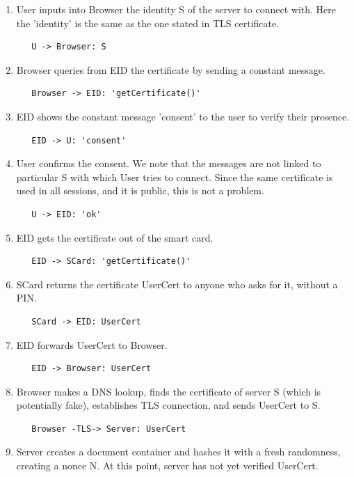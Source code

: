 \begin{enumerate}
\item User inputs into Browser the identity S of the server to connect with. Here the 'identity' is the same as the one stated in TLS certificate. 
\begin{verbatim}
   U -> Browser: S
\end{verbatim}
\item Browser queries from EID the certificate by sending a constant message.
\begin{verbatim}
   Browser -> EID: 'getCertificate()'
\end{verbatim}
\item EID shows the constant message 'consent' to the user to verify their presence.
\begin{verbatim}
   EID -> U: 'consent'
\end{verbatim}
\item User confirms the consent. We note that the messages are not linked to particular S with which User tries to connect. Since the same certificate is used in all sessions, and it is public, this is not a problem.
\begin{verbatim}
   U -> EID: 'ok'
\end{verbatim}
\item EID gets the certificate out of the smart card.
\begin{verbatim}
   EID -> SCard: 'getCertificate()'
\end{verbatim}
\item SCard returns the certificate UserCert to anyone who asks for it, without a PIN.
\begin{verbatim}
   SCard -> EID: UserCert
\end{verbatim}
\item EID forwards UserCert to Browser.
\begin{verbatim}
   EID -> Browser: UserCert
\end{verbatim}
\item Browser makes a DNS lookup, finds the certificate of server S (which is potentially fake), establishes TLS connection, and sends UserCert to S.
\begin{verbatim}
   Browser -TLS-> Server: UserCert
\end{verbatim}
\item Server creates a document container and hashes it with a fresh randomness, creating a nonce N. At this point, server has not yet verified UserCert.


\end{enumerate}
